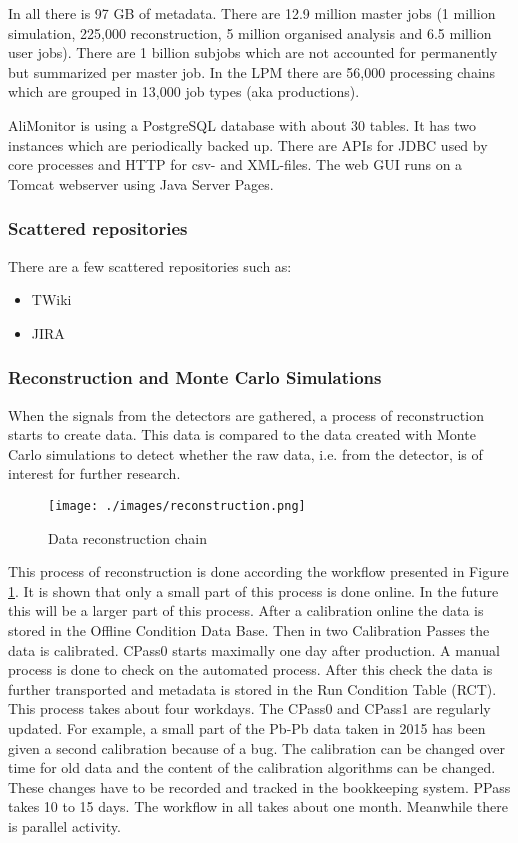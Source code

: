 In all there is 97 GB of metadata. There are 12.9 million master jobs (1 million simulation, 225,000 reconstruction, 5 million organised analysis and 6.5 million user jobs). There are 1 billion subjobs which are not accounted for permanently but summarized per master job. In the LPM there are 56,000 processing chains which are grouped in 13,000 job types (aka productions).

AliMonitor is using a PostgreSQL database with about 30 tables. It has two instances which are periodically backed up. There are APIs for JDBC used by core processes and HTTP for csv- and XML-files. The web GUI runs on a Tomcat webserver using Java Server Pages.

\subsubsection{Scattered repositories}
There are a few scattered repositories such as:
\begin{itemize}
  \item TWiki
  \item JIRA
\end{itemize}

\subsubsection{Reconstruction and Monte Carlo Simulations}
When the signals from the detectors are gathered, a process of reconstruction starts to create data. This data is compared to the data created with Monte Carlo simulations to detect whether the raw data, i.e. from the detector, is of interest for further research. 

\begin{figure}[h]
  \begin{center}
    \texttt{[image: ./images/reconstruction.png]}
    \caption{Data reconstruction chain}
    \label{fig:reconstruction}
  \end{center}
\end{figure}

This process of reconstruction is done according the workflow presented in Figure \ref{fig:reconstruction}. It is shown that only a small part of this process is done online. In the future this will be a larger part of this process. After a calibration online the data is stored in the Offline Condition Data Base. Then in two Calibration Passes the data is calibrated. CPass0 starts maximally one day after production. A manual process is done to check on the automated process. After this check the data is further transported and metadata is stored in the Run Condition Table (RCT). This process takes about four workdays. The CPass0 and CPass1 are regularly updated. For example, a small part of the Pb-Pb data taken in 2015 has been given a second calibration because of a bug. The calibration can be changed over time for old data and the content of the calibration algorithms can be changed. These changes have to be recorded and tracked in the bookkeeping system. PPass takes 10 to 15 days. The workflow in all takes about one month. Meanwhile there is parallel activity.

